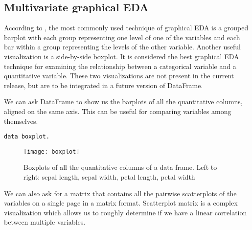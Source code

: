 \documentclass[sigplan]{acmart}
\begin{document}
\subsection{Multivariate graphical EDA}
\label{sec:multi-graph}

According to \cite{Seltman}, the most commonly used technique of graphical EDA is a grouped barplot with each group representing one level of one of the variables and each bar within a group representing the levels of the other variable. Another useful visualization is a side-by-side boxplot. It is considered the best graphical EDA technique for examining the relationship between a categorical variable and a quantitative variable. These two visualizations are not present in the current release, but are to be integrated in a future version of DataFrame.

We can ask DataFrame to show us the barplots of all the quantitative columns, aligned on the same axis. This can be useful for comparing variables among themselves.

\begin{lstlisting}[basicstyle=\small,language=Smalltalk]
data boxplot.
\end{lstlisting}
\begin{figure}[H]
  \begin{center}
  \texttt{[image: boxplot]}
  \caption{Boxplots of all the quantitative columns of a data frame. Left to right: sepal length, sepal width, petal length, petal width}
  \end{center}
\end{figure}

%
%

We can also ask for a matrix that contains all the pairwise scatterplots of the variables on a single page in a matrix format. Scatterplot matrix is a complex visualization which allows us to roughly determine if we have a linear correlation between multiple variables.
\end{document}
